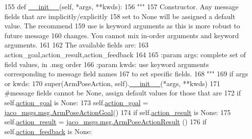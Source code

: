 \begin{DoxyCode}
155   \textcolor{keyword}{def }\hyperlink{classjaco__msgs_1_1msg_1_1__ArmPoseAction_1_1ArmPoseAction_a6deb87aa69978cf47e5a8e8a0887a8fa}{\_\_init\_\_}(self, *args, **kwds):
156     \textcolor{stringliteral}{"""}
157 \textcolor{stringliteral}{    Constructor. Any message fields that are implicitly/explicitly}
158 \textcolor{stringliteral}{    set to None will be assigned a default value. The recommend}
159 \textcolor{stringliteral}{    use is keyword arguments as this is more robust to future message}
160 \textcolor{stringliteral}{    changes.  You cannot mix in-order arguments and keyword arguments.}
161 \textcolor{stringliteral}{}
162 \textcolor{stringliteral}{    The available fields are:}
163 \textcolor{stringliteral}{       action\_goal,action\_result,action\_feedback}
164 \textcolor{stringliteral}{}
165 \textcolor{stringliteral}{    :param args: complete set of field values, in .msg order}
166 \textcolor{stringliteral}{    :param kwds: use keyword arguments corresponding to message field names}
167 \textcolor{stringliteral}{    to set specific fields.}
168 \textcolor{stringliteral}{    """}
169     \textcolor{keywordflow}{if} args \textcolor{keywordflow}{or} kwds:
170       super(ArmPoseAction, self).\hyperlink{classjaco__msgs_1_1msg_1_1__ArmPoseAction_1_1ArmPoseAction_a6deb87aa69978cf47e5a8e8a0887a8fa}{\_\_init\_\_}(*args, **kwds)
171       \textcolor{comment}{#message fields cannot be None, assign default values for those that are}
172       \textcolor{keywordflow}{if} self.\hyperlink{classjaco__msgs_1_1msg_1_1__ArmPoseAction_1_1ArmPoseAction_ababc0bb07c8926c3e8d55dfd2ddacdf4}{action\_goal} \textcolor{keywordflow}{is} \textcolor{keywordtype}{None}:
173         self.\hyperlink{classjaco__msgs_1_1msg_1_1__ArmPoseAction_1_1ArmPoseAction_ababc0bb07c8926c3e8d55dfd2ddacdf4}{action\_goal} = \hyperlink{classjaco__msgs_1_1msg_1_1__ArmPoseActionGoal_1_1ArmPoseActionGoal}{jaco\_msgs.msg.ArmPoseActionGoal}()
174       \textcolor{keywordflow}{if} self.\hyperlink{classjaco__msgs_1_1msg_1_1__ArmPoseAction_1_1ArmPoseAction_a15c3aa8e8baead8d23478de23af61ca0}{action\_result} \textcolor{keywordflow}{is} \textcolor{keywordtype}{None}:
175         self.\hyperlink{classjaco__msgs_1_1msg_1_1__ArmPoseAction_1_1ArmPoseAction_a15c3aa8e8baead8d23478de23af61ca0}{action\_result} = \hyperlink{classjaco__msgs_1_1msg_1_1__ArmPoseActionResult_1_1ArmPoseActionResult}{jaco\_msgs.msg.ArmPoseActionResult}
      ()
176       \textcolor{keywordflow}{if} self.\hyperlink{classjaco__msgs_1_1msg_1_1__ArmPoseAction_1_1ArmPoseAction_a4e1fca881430990eb71fe999027640aa}{action\_feedback} \textcolor{keywordflow}{is} \textcolor{keywordtype}{None}:

\end{DoxyCode}
